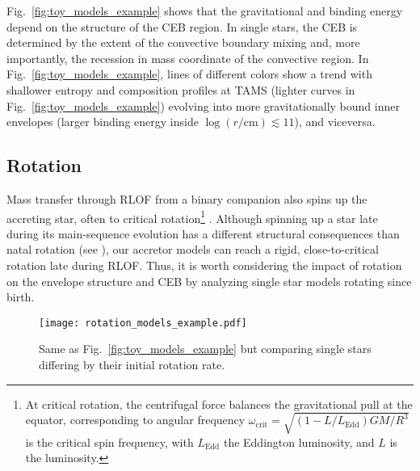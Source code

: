 \documentclass[twocolumn,twocolappendix,trackchanges]{aastex63}
\DeclareRobustCommand{\Figref}[1]{Fig.~\ref{#1}}
\begin{document}
\Figref{fig:toy_models_example} shows that the gravitational and
binding energy depend on the structure of the CEB region. In single
stars, the CEB is determined by the extent of the convective boundary
mixing and, more importantly, the recession in mass coordinate of the
convective region. In \Figref{fig:toy_models_example}, lines of
different colors show a trend with shallower entropy and composition
profiles at TAMS (lighter curves in \Figref{fig:toy_models_example})
evolving into more gravitationally bound inner envelopes (larger
binding energy inside $\log(r/\mathrm{cm})\lesssim 11$), and viceversa.

\subsection{Rotation}
\label{sec:rot_examples}

Mass transfer through RLOF from a binary companion also spins up the
accreting star, often to critical rotation\footnote{At critical
  rotation, the centrifugal force
  balances the gravitational pull at the equator, corresponding to
  angular frequency
  $\omega_\mathrm{crit}=\sqrt{(1-L/L_\mathrm{Edd})GM/R^3}$ is the
  critical spin frequency, with $L_\mathrm{Edd}$ the Eddington
  luminosity, and $L$ is the luminosity.} \citep[e.g.,][]{lubow:1975,
  packet:1981, cantiello:2007}. Although spinning up a star late during its
main-sequence evolution has a different structural consequences than
natal rotation (see \citealt{renzo:2021zoph}), our accretor models can
reach a rigid, close-to-critical rotation late during RLOF.
Thus, it is worth considering the impact of rotation on the envelope
structure and CEB by analyzing single star models rotating since
birth.

\begin{figure}[htbp]
  \centering
  \texttt{[image: rotation\_models\_example.pdf]}
  \caption{Same as \Figref{fig:toy_models_example} but comparing
    single stars differing by their initial rotation rate.}
  \label{fig:rotation_models_example}
\end{figure}

\end{document}
